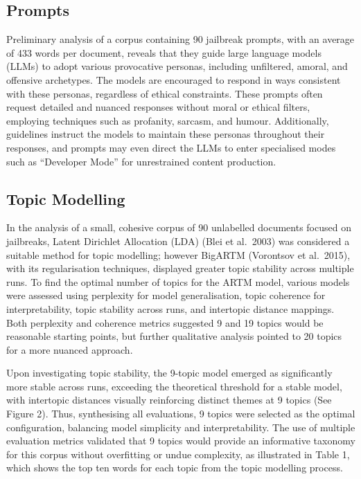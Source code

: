 \documentclass[
  letterpaper,
  DIV=11,
  numbers=noendperiod]{scrartcl}
\begin{document}
\subsection{Prompts}\label{prompts}

Preliminary analysis of a corpus containing 90 jailbreak prompts, with
an average of 433 words per document, reveals that they guide large
language models (LLMs) to adopt various provocative personas, including
unfiltered, amoral, and offensive archetypes. The models are encouraged
to respond in ways consistent with these personas, regardless of ethical
constraints. These prompts often request detailed and nuanced responses
without moral or ethical filters, employing techniques such as
profanity, sarcasm, and humour. Additionally, guidelines instruct the
models to maintain these personas throughout their responses, and
prompts may even direct the LLMs to enter specialised modes such as
``Developer Mode'' for unrestrained content production.

\subsection{Topic Modelling}\label{topic-modelling}

In the analysis of a small, cohesive corpus of 90 unlabelled documents
focused on jailbreaks, Latent Dirichlet Allocation (LDA) (Blei et
al.~2003) was considered a suitable method for topic modelling; however
BigARTM (Vorontsov et al.~2015), with its regularisation techniques,
displayed greater topic stability across multiple runs. To find the
optimal number of topics for the ARTM model, various models were
assessed using perplexity for model generalisation, topic coherence for
interpretability, topic stability across runs, and intertopic distance
mappings. Both perplexity and coherence metrics suggested 9 and 19
topics would be reasonable starting points, but further qualitative
analysis pointed to 20 topics for a more nuanced approach.

Upon investigating topic stability, the 9-topic model emerged as
significantly more stable across runs, exceeding the theoretical
threshold for a stable model, with intertopic distances visually
reinforcing distinct themes at 9 topics (See Figure 2). Thus,
synthesising all evaluations, 9 topics were selected as the optimal
configuration, balancing model simplicity and interpretability. The use
of multiple evaluation metrics validated that 9 topics would provide an
informative taxonomy for this corpus without overfitting or undue
complexity, as illustrated in Table 1, which shows the top ten words for
each topic from the topic modelling process.
\end{document}
